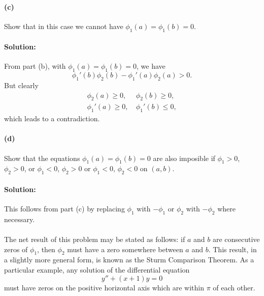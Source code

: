 \documentclass{article}
\begin{document}
\paragraph{(c)} Show that in this case we cannot have $\phi_1(a) = \phi_1(b) =
0$.

\paragraph{Solution:} From part (b), with $\phi_1(a) = \phi_1(b) = 0$, we have
\begin{equation*}
  \phi_1'(b)\phi_2(b) - \phi_1'(a)\phi_2(a) > 0.
\end{equation*} But clearly \begin{align*}
  \phi_2(a) \geq 0,  \: &\phi_2(b) \geq 0, \\
  \phi_1'(a) \geq 0, \: &\phi_1'(b) \leq 0,
\end{align*} which leads to a contradiction.

\paragraph{(d)} Show that the equations $\phi_1(a) = \phi_1(b) = 0$ are also
imposible if $\phi_1 > 0$, $\phi_2 > 0$, or $\phi_1 < 0$, $\phi_2 > 0$ or
$\phi_1 < 0$, $\phi_2 < 0$ on $(a, b)$.

\paragraph{Solution:} This follows from part (c) by replacing $\phi_1$ with
$-\phi_1$ or $\phi_2$ with $-\phi_2$ where necessary.

\paragraph{} The net result of this problem may be stated as follows: if $a$
and $b$ are consecutive zeros of $\phi_1$, then $\phi_2$ must have a zero
somewhere between $a$ and $b$. This result, in a slightly more general form, is
known as the Sturm Comparison Theorem. As a particular example, any solution of
the differential equation \begin{equation*}
  y'' + (x + 1)y = 0
\end{equation*} must have zeros on the positive horizontal axis which are
within $\pi$ of each other.
\end{document}
